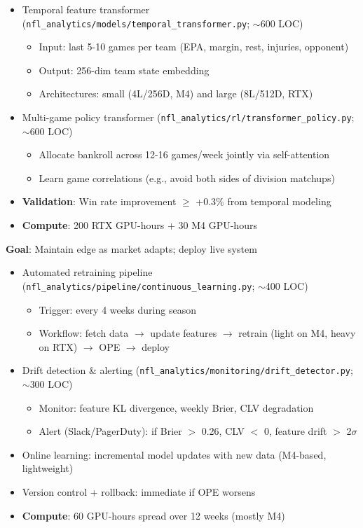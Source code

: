 \begin{itemize}
  \item {} Temporal feature transformer (\texttt{nfl\_analytics/models/temporal\_transformer.py}; $\sim$600 LOC)
  \begin{itemize}
    \item Input: last 5-10 games per team (EPA, margin, rest, injuries, opponent)
    \item Output: 256-dim team state embedding
    \item Architectures: small (4L/256D, M4) and large (8L/512D, RTX)
  \end{itemize}
  \item {} Multi-game policy transformer (\texttt{nfl\_analytics/rl/transformer\_policy.py}; $\sim$600 LOC)
  \begin{itemize}
    \item Allocate bankroll across 12-16 games/week jointly via self-attention
    \item Learn game correlations (e.g., avoid both sides of division matchups)
  \end{itemize}
  \item {} \textbf{Validation}: Win rate improvement $\ge$ +0.3\% from temporal modeling
  \item \textbf{Compute}: 200 RTX GPU-hours + 30 M4 GPU-hours
\end{itemize}

\textbf{Goal}: Maintain edge as market adapts; deploy live system

\begin{itemize}
  \item {} Automated retraining pipeline (\texttt{nfl\_analytics/pipeline/continuous\_learning.py}; $\sim$400 LOC)
  \begin{itemize}
    \item Trigger: every 4 weeks during season
    \item Workflow: fetch data $\to$ update features $\to$ retrain (light on M4, heavy on RTX) $\to$ OPE $\to$ deploy
  \end{itemize}
  \item {} Drift detection \& alerting (\texttt{nfl\_analytics/monitoring/drift\_detector.py}; $\sim$300 LOC)
  \begin{itemize}
    \item Monitor: feature KL divergence, weekly Brier, CLV degradation
    \item Alert (Slack/PagerDuty): if Brier $>$ 0.26, CLV $<$ 0, feature drift $>$ 2$\sigma$
  \end{itemize}
  \item {} Online learning: incremental model updates with new data (M4-based, lightweight)
  \item {} Version control + rollback: immediate if OPE worsens
  \item \textbf{Compute}: 60 GPU-hours spread over 12 weeks (mostly M4)
\end{itemize}

